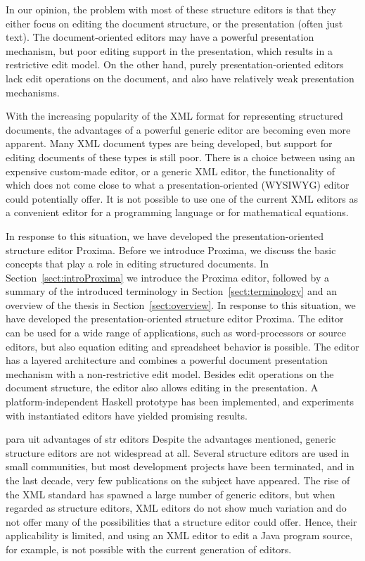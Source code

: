 In our opinion, the problem with most of these structure editors is that they either focus on editing the document structure, or the presentation (often just text).
The document-oriented editors may have a powerful presentation mechanism, but poor editing support in the presentation, which results in a restrictive edit model. On the other hand,  purely presentation-oriented editors lack edit operations on the document, and also have relatively weak presentation mechanisms.

With the increasing popularity of the XML format for representing structured documents, the advantages of a powerful generic editor are becoming even more apparent. Many XML document types are being developed, but support for editing documents of these types is still poor. 
There is a choice between using an expensive custom-made editor, or a generic XML editor, the functionality of which does  not come close to what a presentation-oriented (WYSIWYG) editor could potentially offer. It is not possible to use one of the current XML editors as a convenient editor for a programming language or for mathematical equations.

In response to this situation, we have developed  the presentation-oriented structure editor Proxima. Before we introduce Proxima, we discuss the basic concepts that play a role in editing structured documents. In Section~\ref{sect:introProxima} we introduce the Proxima editor, followed by a summary of the introduced terminology in Section~\ref{sect:terminology} and an overview of the thesis in Section~\ref{sect:overview}.
\bc
In response to this situation, we have developed  the presentation-oriented structure editor Proxima. The editor can be used for a wide range of applications, such as word-processors or source editors, but also equation editing and spreadsheet behavior is possible. The editor has a layered architecture and combines a powerful document presentation mechanism with a non-restrictive edit model. Besides edit operations on the document structure, the editor also allows editing in the presentation.  A platform-independent Haskell prototype has been implemented, and experiments with instantiated editors have yielded promising results.
\ec

\bc para uit advantages of str editors
Despite the advantages mentioned, generic structure editors are not widespread at all. Several structure editors are used in small communities, but most development projects have been terminated, and in the last decade, very few publications on the subject have appeared. The rise of the XML standard has spawned a large number of generic editors, but when regarded as structure editors, XML editors do not show much variation and do not offer many of the possibilities that a structure editor could offer. Hence, their applicability is limited, and using an XML editor to edit a Java program source, for example, is not possible with the current generation of editors.
\ec





